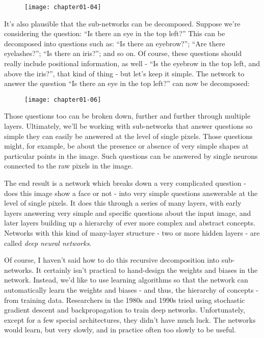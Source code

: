 \begin{figure}[h]
\texttt{[image: chapter01-04]}
\end{figure}

\FloatBarrier

It's also plausible that the sub-networks can be decomposed. Suppose we're considering the question: ``Is there an eye in the top left?'' This can be decomposed into questions such as: ``Is there an eyebrow?''; ``Are there eyelashes?''; ``Is there an iris?''; and so on. Of course, these questions should really include positional information, as well - ``Is the eyebrow in the top left, and above the iris?'', that kind of thing - but let's keep it simple. The network to answer the question ``Is there an eye in the top left?'' can now be decomposed:


\begin{figure}[h]
\texttt{[image: chapter01-06]}
\end{figure}

Those questions too can be broken down, further and further through multiple layers. Ultimately, we'll be working with sub-networks that answer questions so simple they can easily be answered at the level of single pixels. Those questions might, for example, be about the presence or absence of very simple shapes at particular points in the image. Such questions can be answered by single neurons connected to the raw pixels in the image.

The end result is a network which breaks down a very complicated question - does this image show a face or not - into very simple questions answerable at the level of single pixels. It does this through a series of many layers, with early layers answering very simple and specific questions about the input image, and later layers building up a hierarchy of ever more complex and abstract concepts. Networks with this kind of many-layer structure - two or more hidden layers - are called \textit{deep neural networks}.

Of course, I haven't said how to do this recursive decomposition into sub-networks. It certainly isn't practical to hand-design the weights and biases in the network. Instead, we'd like to use learning algorithms so that the network can automatically learn the weights and biases - and thus, the hierarchy of concepts - from training data. Researchers in the 1980s and 1990s tried using stochastic gradient descent and backpropagation to train deep networks. Unfortunately, except for a few special architectures, they didn't have much luck. The networks would learn, but very slowly, and in practice often too slowly to be useful.

